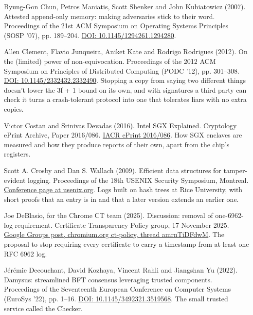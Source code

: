 \documentclass[11pt,twoside]{article}
\theoremstyle{thielethm}
\theoremstyle{thieledef}
\theoremstyle{thieledef}
\theoremstyle{thieledef}
\theoremstyle{thielethm}
\theoremstyle{thieleobs}
\theoremstyle{thielethm}
\begin{document}
\noindent Byung-Gon Chun, Petros Maniatis, Scott Shenker and John Kubiatowicz (2007). Attested append-only memory: making adversaries stick to their word. Proceedings of the 21st ACM Symposium on Operating Systems Principles (SOSP '07), pp. 189--204. \href{https://doi.org/10.1145/1294261.1294280}{DOI: 10.1145/1294261.1294280}.
\par\medskip

\noindent Allen Clement, Flavio Junqueira, Aniket Kate and Rodrigo Rodrigues (2012). On the (limited) power of non-equivocation. Proceedings of the 2012 ACM Symposium on Principles of Distributed Computing (PODC '12), pp. 301--308. \href{https://doi.org/10.1145/2332432.2332490}{DOI: 10.1145/2332432.2332490}. Stopping a copy from saying two different things doesn't lower the 3f + 1 bound on its own, and with signatures a third party can check it turns a crash-tolerant protocol into one that tolerates liars with no extra copies.
\par\medskip

\noindent Victor Costan and Srinivas Devadas (2016). Intel SGX Explained. Cryptology ePrint Archive, Paper 2016/086. \href{https://eprint.iacr.org/2016/086}{IACR ePrint 2016/086}. How SGX enclaves are measured and how they produce reports of their own, apart from the chip's registers.
\par\medskip

\noindent Scott A. Crosby and Dan S. Wallach (2009). Efficient data structures for tamper-evident logging. Proceedings of the 18th USENIX Security Symposium, Montreal. \href{https://www.usenix.org/conference/usenixsecurity09/technical-sessions/presentation/efficient-data-structures-tamper-evident}{Conference page at usenix.org}. Logs built on hash trees at Rice University, with short proofs that an entry is in and that a later version extends an earlier one.
\par\medskip

\noindent Joe DeBlasio, for the Chrome CT team (2025). Discussion: removal of one-6962-log requirement. Certificate Transparency Policy group, 17 November 2025. \href{https://groups.google.com/a/chromium.org/g/ct-policy/c/amrnTiDFdwM/m/mCyPDc4TAwAJ}{Google Groups post, chromium.org ct-policy, thread amrnTiDFdwM}. The proposal to stop requiring every certificate to carry a timestamp from at least one RFC 6962 log.
\par\medskip

\noindent J\'er\'emie Decouchant, David Kozhaya, Vincent Rahli and Jiangshan Yu (2022). Damysus: streamlined BFT consensus leveraging trusted components. Proceedings of the Seventeenth European Conference on Computer Systems (EuroSys '22), pp. 1--16. \href{https://doi.org/10.1145/3492321.3519568}{DOI: 10.1145/3492321.3519568}. The small trusted service called the Checker.
\par\medskip
\end{document}
